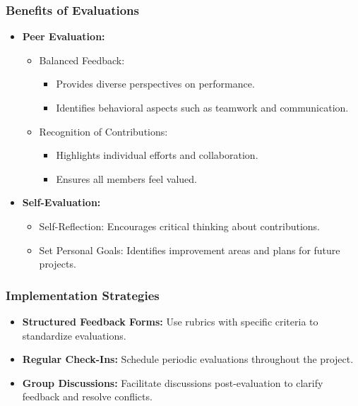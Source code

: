 \documentclass{beamer}
\begin{document}
\begin{frame}[fragile]
    \frametitle{Benefits of Evaluations}
    
    \begin{itemize}
        \item \textbf{Peer Evaluation:}
        \begin{itemize}
            \item Balanced Feedback: 
            \begin{itemize}
                \item Provides diverse perspectives on performance.
                \item Identifies behavioral aspects such as teamwork and communication.
            \end{itemize}
            \item Recognition of Contributions: 
            \begin{itemize}
                \item Highlights individual efforts and collaboration.
                \item Ensures all members feel valued.
            \end{itemize}
        \end{itemize}
        
        \item \textbf{Self-Evaluation:}
        \begin{itemize}
            \item Self-Reflection: Encourages critical thinking about contributions.
            \item Set Personal Goals: Identifies improvement areas and plans for future projects.
        \end{itemize}
    \end{itemize}
\end{frame}

\begin{frame}[fragile]
    \frametitle{Implementation Strategies}
    
    \begin{itemize}
        \item \textbf{Structured Feedback Forms:} Use rubrics with specific criteria to standardize evaluations.
        \item \textbf{Regular Check-Ins:} Schedule periodic evaluations throughout the project.
        \item \textbf{Group Discussions:} Facilitate discussions post-evaluation to clarify feedback and resolve conflicts.
    \end{itemize}
\end{frame}
\end{document}
